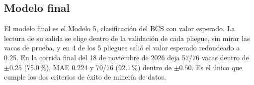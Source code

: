 \subsection{Modelo final}

El modelo final es el Modelo 5, clasificación del BCS con valor esperado. La lectura de su salida se elige dentro de la validación de cada pliegue, sin mirar las vacas de prueba, y en 4 de los 5 pliegues salió el valor esperado redondeado a 0.25. En la corrida final del 18 de noviembre de 2026 deja 57/76 vacas dentro de $\pm0.25$ (75.0\,\%), MAE 0.224 y 70/76 (92.1\,\%) dentro de $\pm0.50$. Es el único que cumple los dos criterios de éxito de minería de datos.
